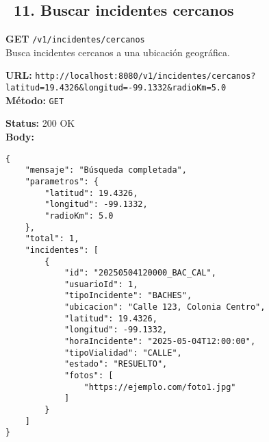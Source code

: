 \subsection*{\faServer\ 11. Buscar incidentes cercanos}
\begin{tcolorbox}[endpoint]
    \textbf{GET} \texttt{/v1/incidentes/cercanos}\\
    Busca incidentes cercanos a una ubicación geográfica.
\end{tcolorbox}

\begin{tcolorbox}[request]
    \textbf{URL:} \textcolor{urlColor}{\texttt{http://localhost:8080/v1/incidentes/cercanos?latitud=19.4326\&longitud=-99.1332\&radioKm=5.0}}\\
    \textbf{Método:} \textcolor{methodColor}{\texttt{GET}}
\end{tcolorbox}

\begin{tcolorbox}[response]
    \textbf{Status:} 200 OK\\
    \textbf{Body:}
    \begin{verbatim}
{
    "mensaje": "Búsqueda completada",
    "parametros": {
        "latitud": 19.4326,
        "longitud": -99.1332,
        "radioKm": 5.0
    },
    "total": 1,
    "incidentes": [
        {
            "id": "20250504120000_BAC_CAL",
            "usuarioId": 1,
            "tipoIncidente": "BACHES",
            "ubicacion": "Calle 123, Colonia Centro",
            "latitud": 19.4326,
            "longitud": -99.1332,
            "horaIncidente": "2025-05-04T12:00:00",
            "tipoVialidad": "CALLE",
            "estado": "RESUELTO",
            "fotos": [
                "https://ejemplo.com/foto1.jpg"
            ]
        }
    ]
}
    \end{verbatim}
\end{tcolorbox}